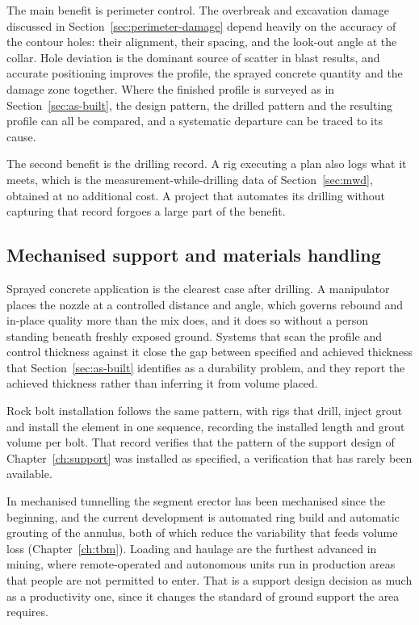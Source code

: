 The main benefit is perimeter control. The overbreak and
excavation damage discussed in Section~\ref{sec:perimeter-damage} depend
heavily on the accuracy of the contour holes: their alignment, their spacing,
and the look-out angle at the collar. Hole deviation is the dominant source of
scatter in blast results, and accurate positioning improves the profile, the
sprayed concrete quantity and the damage zone together. Where the finished profile is
surveyed as in Section~\ref{sec:as-built}, the design pattern,
the drilled pattern and the resulting profile can all be compared, and a
systematic departure can be traced to its cause.

The second benefit is the drilling record. A rig executing a plan also
logs what it meets, which is the measurement-while-drilling data of
Section~\ref{sec:mwd}, obtained at no additional cost. A project that
automates its drilling without capturing that record forgoes a large part
of the benefit.

\subsection{Mechanised support and materials handling}
\label{sec:mechanised-support}

Sprayed concrete application is the clearest case after drilling. A
manipulator places the nozzle at a controlled distance and angle, which
governs rebound and in-place quality more than the mix does, and it does so
without a person standing beneath freshly exposed ground. Systems that scan
the profile and control thickness against it close the gap between specified
and achieved thickness that Section~\ref{sec:as-built} identifies as a
durability problem, and they report the achieved thickness rather than
inferring it from volume placed.

Rock bolt installation follows the same pattern, with rigs that drill,
inject grout and install the element in one sequence, recording the installed
length and grout volume per bolt. That record verifies that the pattern of the
support design of Chapter~\ref{ch:support} was installed as specified, a
verification that has rarely been available.

In mechanised tunnelling the segment erector has been mechanised since the
beginning, and the current development is automated ring build and automatic
grouting of the annulus, both of which reduce the variability that feeds volume
loss (Chapter~\ref{ch:tbm}). Loading and haulage are the furthest
advanced in mining, where remote-operated and autonomous units run in
production areas that people are not permitted to enter. That is a support
design decision as much as a productivity one, since it changes the
standard of ground support the area requires.

